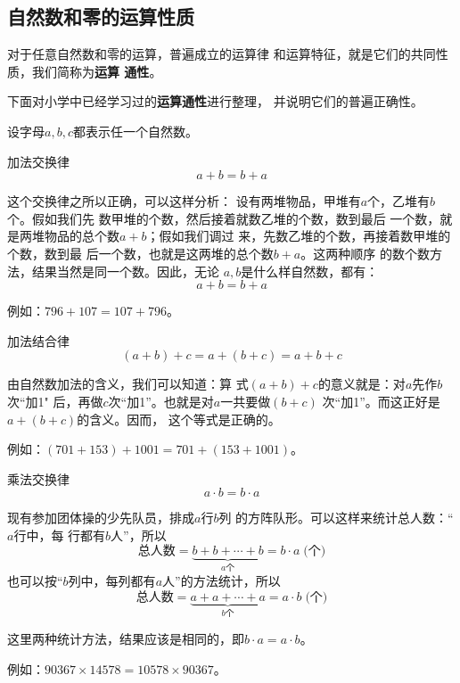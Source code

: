 \subsection{自然数和零的运算性质}
对于任意自然数和零的运算，普遍成立的运算律
和运算特征，就是它们的共同性质，我们简称为\textbf{运算
通性}。

下面对小学中已经学习过的\textbf{运算通性}进行整理，
并说明它们的普遍正确性。

设字母$a,  b,  c$都表示任一个自然数。

\begin{blk}{加法交换律}
\[a+b=b+a \]
\end{blk}
\begin{note}
    这个交换律之所以正确，可以这样分析：
设有两堆物品，甲堆有$a$个，乙堆有$b$个。假如我们先
数甲堆的个数，然后接着就数乙堆的个数，数到最后
一个数，就是两堆物品的总个数$a+b$；假如我们调过
来，先数乙堆的个数，再接着数甲堆的个数，数到最
后一个数，也就是这两堆的总个数$b+a$。这两种顺序
的数个数方法，结果当然是同一个数。因此，无论
$a, b$是什么样自然数，都有：
\[a+b=b+a \]

例如：$796+107=107+796$。
\end{note}


\begin{blk}{加法结合律}
    \[(a+b)+c=a+(b+c)=a+b+c \]
    \end{blk}
\begin{note}
    由自然数加法的含义，我们可以知道：算
式$(a+b) +c$的意义就是：对$a$先作$b$次“加1"
后，再做$c$次“加1”。也就是对$a$一共要做$(b+c)$
次“加1”。而这正好是$a+ (b+c)$的含义。因而，
这个等式是正确的。

    例如：$(701+153)+1001 =701+(153+1001)$。
\end{note}


    \begin{blk}{乘法交换律}
        \[a\cdot b=b\cdot a \]
        \end{blk}
\begin{note}
    现有参加团体操的少先队员，排成$a$行$b$列
的方阵队形。可以这样来统计总人数：“$a$行中，每
行都有$b$人”，所以
\[\text{总人数}=\underbrace{b+b+\cdots+b}_{a\text{个}}=b\cdot a \; \text{(个)} \]
也可以按“$b$列中，每列都有$a$人”的方法统计，所以
\[\text{总人数}=\underbrace{a+a+\cdots+a}_{b\text{个}}=a\cdot b \; \text{(个)} \]

这里两种统计方法，结果应该是相同的，即$b\cdot a=a\cdot b$。

例如：$90367 \times  14578=10578 \times  90367$。
\end{note}
        


